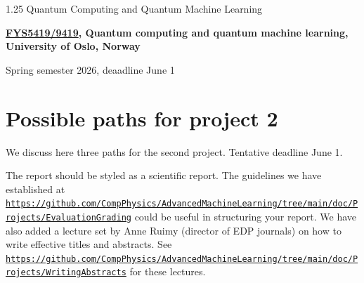 \documentclass[%
oneside,                 %
final,                   %
10pt]{article}
\begin{document}

\newcommand{\exercisesection}[1]{\subsection*{#1}}






\thispagestyle{empty}

\begin{center}
{\LARGE\bf
\begin{spacing}{1.25}
Quantum Computing and Quantum Machine Learning
\end{spacing}
}
\end{center}


\begin{center}
{\bf \href{{https://www.uio.no/studier/emner/matnat/fys/FYS5419/index-eng.html}}{FYS5419/9419}, Quantum computing and quantum machine learning, University of Oslo, Norway${}^{}$} \\ [0mm]
\end{center}

\begin{center}
\end{center}
    

\begin{center}
Spring semester 2026, deaadline June 1
\end{center}

\vspace{1cm}


\section*{Possible paths for project 2}

We discuss here three paths for the second project.
Tentative deadline June 1.

The report should be styled as a scientific report. The guidelines
we have established at
\href{{https://github.com/CompPhysics/AdvancedMachineLearning/tree/main/doc/Projects/EvaluationGrading}}{\nolinkurl{https://github.com/CompPhysics/AdvancedMachineLearning/tree/main/doc/Projects/EvaluationGrading}}
could be useful in structuring your report. We have also added a
lecture set by Anne Ruimy (director of EDP journals) on how to write
effective titles and abstracts. See
\href{{https://github.com/CompPhysics/AdvancedMachineLearning/tree/main/doc/Projects/WritingAbstracts}}{\nolinkurl{https://github.com/CompPhysics/AdvancedMachineLearning/tree/main/doc/Projects/WritingAbstracts}}
for these lectures.
\end{document}
